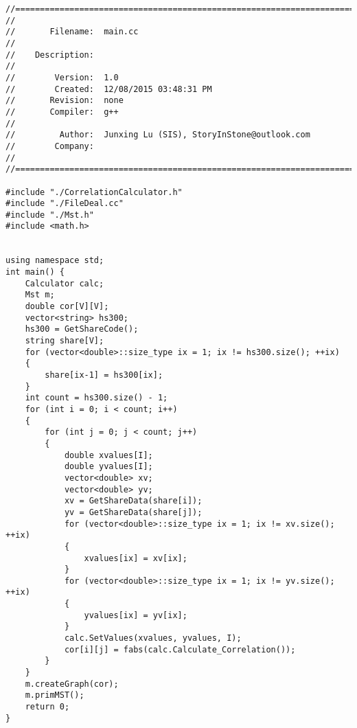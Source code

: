\begin{lstlisting}[caption={main.cc},label=main]
//=======================================================================
// 
//       Filename:  main.cc
// 
//    Description:  
// 
//        Version:  1.0
//        Created:  12/08/2015 03:48:31 PM
//       Revision:  none
//       Compiler:  g++
// 
//         Author:  Junxing Lu (SIS), StoryInStone@outlook.com
//        Company:  
// 
//=======================================================================

#include "./CorrelationCalculator.h"
#include "./FileDeal.cc"
#include "./Mst.h"
#include <math.h>


using namespace std;
int main() {
    Calculator calc;
    Mst m;
    double cor[V][V];
    vector<string> hs300;
    hs300 = GetShareCode();
    string share[V];
    for (vector<double>::size_type ix = 1; ix != hs300.size(); ++ix)
    {
        share[ix-1] = hs300[ix];
    }
    int count = hs300.size() - 1;
    for (int i = 0; i < count; i++)
    {
        for (int j = 0; j < count; j++)
        {
            double xvalues[I];
            double yvalues[I]; 
            vector<double> xv;
            vector<double> yv;
            xv = GetShareData(share[i]);
            yv = GetShareData(share[j]);
            for (vector<double>::size_type ix = 1; ix != xv.size(); ++ix)
            {
                xvalues[ix] = xv[ix];
            }
            for (vector<double>::size_type ix = 1; ix != yv.size(); ++ix)
            {
                yvalues[ix] = yv[ix];
            }
            calc.SetValues(xvalues, yvalues, I);
            cor[i][j] = fabs(calc.Calculate_Correlation());
        }
    }
    m.createGraph(cor);
    m.primMST();
    return 0;
}
\end{lstlisting}
